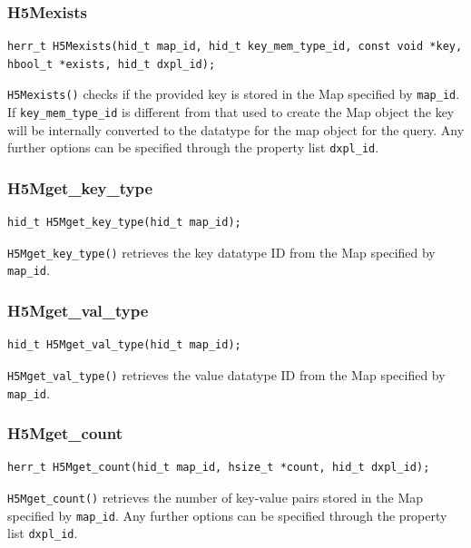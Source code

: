 \subsubsection{H5Mexists}

{
\begin{lstlisting}
herr_t H5Mexists(hid_t map_id, hid_t key_mem_type_id, const void *key, hbool_t *exists, hid_t dxpl_id);
\end{lstlisting}
}

\verb+H5Mexists()+ checks if the provided key is stored in the Map specified by \verb+map_id+. If \verb+key_mem_type_id+ is different from that used to create the Map object the key will be internally converted to the datatype for the map object for the query. Any further options can be specified through the property list \verb+dxpl_id+.

\subsubsection{H5Mget\_key\_type}

{
\begin{lstlisting}
hid_t H5Mget_key_type(hid_t map_id);
\end{lstlisting}
}

\verb+H5Mget_key_type()+ retrieves the key datatype ID from the Map specified by \verb+map_id+.

\subsubsection{H5Mget\_val\_type}

{
\begin{lstlisting}
hid_t H5Mget_val_type(hid_t map_id);
\end{lstlisting}
}

\verb+H5Mget_val_type()+ retrieves the value datatype ID from the Map specified by \verb+map_id+.

\subsubsection{H5Mget\_count}

{
\begin{lstlisting}
herr_t H5Mget_count(hid_t map_id, hsize_t *count, hid_t dxpl_id);
\end{lstlisting}
}

\verb+H5Mget_count()+ retrieves the number of key-value pairs stored in the Map specified by \verb+map_id+. Any further options can be specified through the property list \verb+dxpl_id+.

